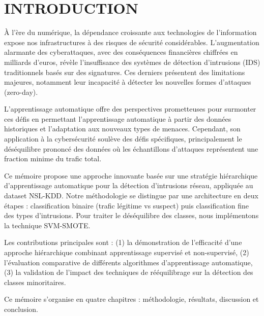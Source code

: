 \newpage
\chapter*{INTRODUCTION}

\setcounter{page}{1}

\noindent
À l'ère du numérique, la dépendance croissante aux technologies de l'information expose nos infrastructures à des risques de sécurité considérables. L'augmentation alarmante des cyberattaques, avec des conséquences financières chiffrées en milliards d'euros, révèle l'insuffisance des systèmes de détection d'intrusions (IDS) traditionnels basés sur des signatures. Ces derniers présentent des limitations majeures, notamment leur incapacité à détecter les nouvelles formes d'attaques (zero-day).

\vspace{0.5cm}

\noindent
L'apprentissage automatique offre des perspectives prometteuses pour surmonter ces défis en permettant l'apprentissage automatique à partir des données historiques et l'adaptation aux nouveaux types de menaces. Cependant, son application à la cybersécurité soulève des défis spécifiques, principalement le déséquilibre prononcé des données où les échantillons d'attaques représentent une fraction minime du trafic total.

\vspace{0.5cm}

\noindent
Ce mémoire propose une approche innovante basée sur une stratégie hiérarchique d'apprentissage automatique pour la détection d'intrusions réseau, appliquée au dataset NSL-KDD. Notre méthodologie se distingue par une architecture en deux étapes : classification binaire (trafic légitime vs suspect) puis classification fine des types d'intrusions. Pour traiter le déséquilibre des classes, nous implémentons la technique SVM-SMOTE.

\vspace{0.5cm}

\noindent
Les contributions principales sont : (1) la démonstration de l'efficacité d'une approche hiérarchique combinant apprentissage supervisé et non-supervisé, (2) l'évaluation comparative de différents algorithmes d'apprentissage automatique, (3) la validation de l'impact des techniques de rééquilibrage sur la détection des classes minoritaires.

\vspace{0.5cm}

\noindent
Ce mémoire s'organise en quatre chapitres : méthodologie, résultats, discussion et conclusion.

\newpage